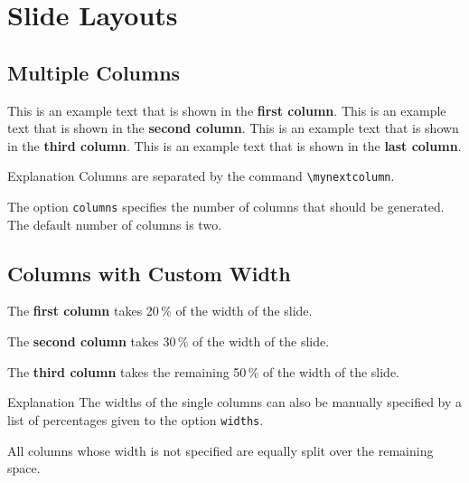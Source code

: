 \documentclass[
	aspectratio=169, %
	8pt, %
]{beamer}
\begin{document}
\section{Slide Layouts}

\subsection{Multiple Columns}
\begin{frame}{\insertsubsection}
	\begin{mycolumns}[columns=4] %
		This is an example text that is shown in the \textbf{first column}.
	\mynextcolumn
		This is an example text that is shown in the \textbf{second column}.
	\mynextcolumn
		This is an example text that is shown in the \textbf{third column}.
	\mynextcolumn
		This is an example text that is shown in the \textbf{last column}.
	\end{mycolumns}
	\vfill
	\begin{note}{Explanation}
		Columns are separated by the command \texttt{\textbackslash mynextcolumn}.

		The option \texttt{columns} specifies the number of columns that should be generated. The default number of columns is two.
	\end{note}
\end{frame}

\subsection{Columns with Custom Width}
\begin{frame}{\insertsubsection}
	\begin{mycolumns}[columns=3,widths={20,30}]
		\begin{example}{}
			The \textbf{first column} takes 20\,\% of the width of the slide.
		\end{example}
	\mynextcolumn
		\begin{example}{}
			The \textbf{second column} takes 30\,\% of the width of the slide.
		\end{example}
	\mynextcolumn
		\begin{example}{}
			The \textbf{third column} takes the remaining 50\,\% of the width of the slide.
		\end{example}
	\end{mycolumns}
	\vfill
	\begin{note}{Explanation}
		The widths of the single columns can also be manually specified by a list of percentages given to the option \texttt{widths}.

		All columns whose width is not specified are equally split over the remaining space.
	\end{note}
\end{frame}
\end{document}

